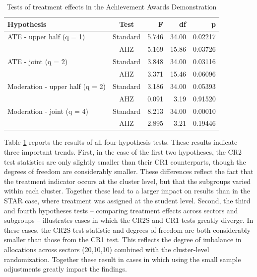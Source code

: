 \documentclass[12pt]{article}\usepackage[]{graphicx}\usepackage[]{color}
\begin{document}
\begin{table}[bth]
\centering
\begin{tabular}{lcrrr}
  \toprule
Hypothesis & Test & F & df & p \\ 
  \midrule
ATE - upper half (q = 1) & Standard & 5.746 & 34.00 & 0.02217 \\ 
   & AHZ & 5.169 & 15.86 & 0.03726 \\ 
  ATE - joint (q = 2) & Standard & 3.848 & 34.00 & 0.03116 \\ 
   & AHZ & 3.371 & 15.46 & 0.06096 \\ 
   \midrule
Moderation - upper half (q = 2) & Standard & 3.186 & 34.00 & 0.05393 \\ 
   & AHZ & 0.091 & 3.19 & 0.91520 \\ 
  Moderation - joint (q = 4) & Standard & 8.213 & 34.00 & 0.00010 \\ 
   & AHZ & 2.895 & 3.21 & 0.19446 \\ 
   \bottomrule
\end{tabular}
\caption{Tests of treatment effects in the Achievement Awards Demonstration} 
\label{tab:AAD}
\end{table}


Table \ref{tab:AAD} reports the results of all four hypothesis tests. 
These results indicate three important trends.
First, in the case of the first two hypotheses, the CR2 test statistics are only slightly smaller than their CR1 counterparts, though the degrees of freedom are considerably smaller. 
These differences reflect the fact that the treatment indicator occurs at the cluster level, but that the subgroups varied within each cluster. 
Together these lead to a larger impact on results than in the STAR case, where treatment was assigned at the student level.
Second, the third and fourth hypotheses tests -- comparing treatment effects across sectors and subgroups -- illustrates cases in which the CR2S and CR1 tests greatly diverge.
In these cases, the CR2S test statistic and degrees of freedom are both considerably smaller than those from the CR1 test. 
This reflects the degree of imbalance in allocations across sectors (20,10,10) combined with the cluster-level randomization. 
Together these result in cases in which using the small sample adjustments greatly impact the findings. 
\end{document}
